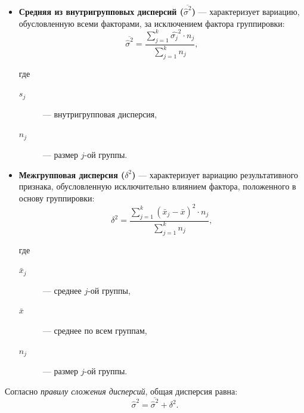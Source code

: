 \begin{enumerate}
\begin{itemize}
        где 
        \begin{description}
            \item[$x_{ij}$] --- $i$-ое значение из $j$-ой группы; 
            \item[$\bar{x}_j$] --- среднее по всей $j$-ой группе; 
            \item[$n_j$] --- размер $j$-ой группы.
        \end{description}

        \item \textbf{Средняя из внутригрупповых дисперсий ($\overline{\hat{\sigma}^2}$)} --- характеризует вариацию, обусловленную всеми факторами, за исключением фактора группировки:
        \begin{equation}
            \label{eq:var_within_mean}
            \overline{\hat{\sigma}^2} = \frac{\sum_{j=1}^{k} \hat{\sigma_j}^2 \cdot n_j}{\sum_{j=1}^{k} n_j}  ,
        \end{equation}

        где 
        \begin{description}
            \item[$s_j$] --- внутригрупповая дисперсия, 
            \item[$n_j$] --- размер $j$-ой группы.
        \end{description}
        
        \item \textbf{Межгрупповая дисперсия ($\delta^2$)} --- характеризует вариацию результативного признака, обусловленную исключительно влиянием фактора, положенного в основу группировки:
        \begin{equation}
            \label{eq:var_between}
            \delta^2 = \frac{\sum_{j=1}^{k} (\bar{x}_j - \bar{x})^2 \cdot n_j}{\sum_{j=1}^{k} n_j}  ,
        \end{equation}

        где 
        \begin{description}
            \item[$\bar{x}_j$] --- среднее $j$-ой группы, 
            \item[$\bar{x}$] --- среднее по всем группам, 
            \item[$n_j$] --- размер $j$-ой группы.
        \end{description}
        
    \end{itemize}

    Согласно \textit{правилу сложения дисперсий}, общая дисперсия равна:
    \begin{equation}
        \hat{\sigma}^2 = \overline{\hat{\sigma}^2} + \delta^2.
    \end{equation}


\end{enumerate}

